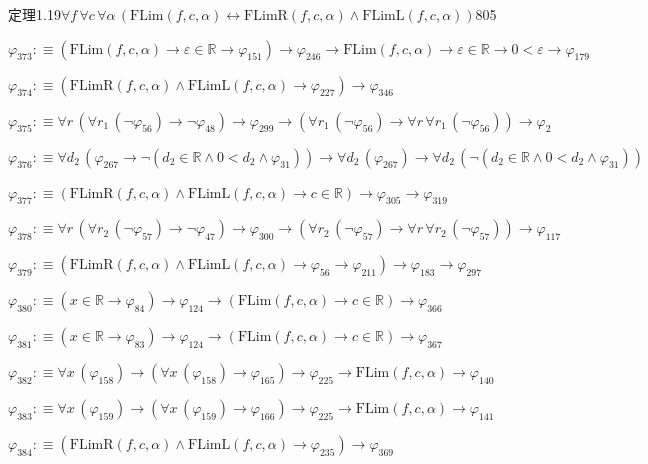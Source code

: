 \begin{fullproof}{定理1.19}{$\forall f\,\forall c\,\forall \alpha\,(\mathrm{FLim}(f,c,\alpha) \leftrightarrow \mathrm{FLimR}(f,c,\alpha) \land \mathrm{FLimL}(f,c,\alpha))$}{805}
\begin{abbrevlist}
\item $\varphi_{373} :\equiv (\mathrm{FLim}(f,c,\alpha) \to \varepsilon \in \mathbb{R} \to \varphi_{151}) \to \varphi_{246} \to \mathrm{FLim}(f,c,\alpha) \to \varepsilon \in \mathbb{R} \to 0 < \varepsilon \to \varphi_{179}$
\item $\varphi_{374} :\equiv (\mathrm{FLimR}(f,c,\alpha) \land \mathrm{FLimL}(f,c,\alpha) \to \varphi_{227}) \to \varphi_{346}$
\item $\varphi_{375} :\equiv \forall r\,(\forall r_{1}\,(\neg \varphi_{56}) \to \neg \varphi_{48}) \to \varphi_{299} \to (\forall r_{1}\,(\neg \varphi_{56}) \to \forall r\,\forall r_{1}\,(\neg \varphi_{56})) \to \varphi_{2}$
\item $\varphi_{376} :\equiv \forall d_{2}\,(\varphi_{267} \to \neg (d_{2} \in \mathbb{R} \land 0 < d_{2} \land \varphi_{31})) \to \forall d_{2}\,(\varphi_{267}) \to \forall d_{2}\,(\neg (d_{2} \in \mathbb{R} \land 0 < d_{2} \land \varphi_{31}))$
\item $\varphi_{377} :\equiv (\mathrm{FLimR}(f,c,\alpha) \land \mathrm{FLimL}(f,c,\alpha) \to c \in \mathbb{R}) \to \varphi_{305} \to \varphi_{319}$
\item $\varphi_{378} :\equiv \forall r\,(\forall r_{2}\,(\neg \varphi_{57}) \to \neg \varphi_{47}) \to \varphi_{300} \to (\forall r_{2}\,(\neg \varphi_{57}) \to \forall r\,\forall r_{2}\,(\neg \varphi_{57})) \to \varphi_{117}$
\item $\varphi_{379} :\equiv (\mathrm{FLimR}(f,c,\alpha) \land \mathrm{FLimL}(f,c,\alpha) \to \varphi_{56} \to \varphi_{211}) \to \varphi_{183} \to \varphi_{297}$
\item $\varphi_{380} :\equiv (x \in \mathbb{R} \to \varphi_{84}) \to \varphi_{124} \to (\mathrm{FLim}(f,c,\alpha) \to c \in \mathbb{R}) \to \varphi_{366}$
\item $\varphi_{381} :\equiv (x \in \mathbb{R} \to \varphi_{83}) \to \varphi_{124} \to (\mathrm{FLim}(f,c,\alpha) \to c \in \mathbb{R}) \to \varphi_{367}$
\item $\varphi_{382} :\equiv \forall x\,(\varphi_{158}) \to (\forall x\,(\varphi_{158}) \to \varphi_{165}) \to \varphi_{225} \to \mathrm{FLim}(f,c,\alpha) \to \varphi_{140}$
\item $\varphi_{383} :\equiv \forall x\,(\varphi_{159}) \to (\forall x\,(\varphi_{159}) \to \varphi_{166}) \to \varphi_{225} \to \mathrm{FLim}(f,c,\alpha) \to \varphi_{141}$
\item $\varphi_{384} :\equiv (\mathrm{FLimR}(f,c,\alpha) \land \mathrm{FLimL}(f,c,\alpha) \to \varphi_{235}) \to \varphi_{369}$

\end{abbrevlist}
\end{fullproof}
